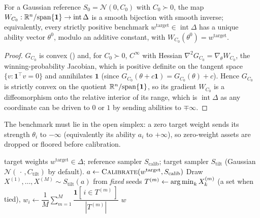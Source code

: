 \begin{lemma}[Calibration]
\label{lem:calib}
For a Gaussian reference $S_0 = \mathcal N(0, C_0)$ with $C_0 \succ 0$, the map
$W_{C_0} : \mathbb{R}^n/\!\operatorname{span}\{\mathbf 1\} \to \operatorname{int}\Delta$ is a
smooth bijection with smooth inverse; equivalently, every strictly positive
benchmark $w^{\mathrm{target}}\in\operatorname{int}\Delta$ has a unique ability
vector $\theta^0$, modulo an additive constant, with
$W_{C_0}(\theta^0) = w^{\mathrm{target}}$.
\end{lemma}
\begin{proof}
$G_{C_0}$ is convex () and, for $C_0\succ0$, $C^\infty$ with
Hessian $\nabla^2 G_{C_0} = \nabla_\theta W_{C_0}$, the winning-probability
Jacobian, which is positive definite on the tangent space
$\{v:\mathbf 1^\top v = 0\}$ and annihilates $\mathbf 1$ (since
$G_{C_0}(\theta + c\mathbf 1) = G_{C_0}(\theta) + c$). Hence $G_{C_0}$ is strictly
convex on the quotient $\mathbb{R}^n/\!\operatorname{span}\{\mathbf 1\}$, so its gradient
$W_{C_0}$ is a diffeomorphism onto the relative interior of its range, which is
$\operatorname{int}\Delta$ as any coordinate can be driven to $0$ or $1$ by sending
abilities to $\mp\infty$.
\end{proof}
\noindent The benchmark must lie in the open simplex: a zero target weight sends its
strength $\theta_i$ to $-\infty$ (equivalently its ability $a_i$ to $+\infty$), so
zero-weight assets are dropped or floored before calibration.

\begin{algorithm}[h]
\caption{Dependence tilt (Thurstone portfolio)}
\label{alg:tilt}
\begin{algorithmic}[1]
\Require target weights $w^{\mathrm{target}}\in\Delta$; reference sampler
         $S_{\mathrm{calib}}$; target sampler $S_{\mathrm{tilt}}$ (Gaussian
         $\mathcal{N}(\,\cdot\,, C_{\mathrm{tilt}})$ by default).
\State $a \gets \textsc{Calibrate}(w^{\mathrm{target}}, S_{\mathrm{calib}})$
\State Draw $X^{(1)},\dots,X^{(M)} \sim S_{\mathrm{tilt}}(a)$ from \emph{fixed} seeds
\State $T^{(m)} \gets \operatorname*{arg\,min}_k X^{(m)}_k$ (a set when tied), \quad
       $w_i \gets \dfrac{1}{M}\sum_{m=1}^{M}
       \dfrac{\mathbf{1}[\, i \in T^{(m)} \,]}{|T^{(m)}|}$
\State \Return $w$
\end{algorithmic}
\end{algorithm}

